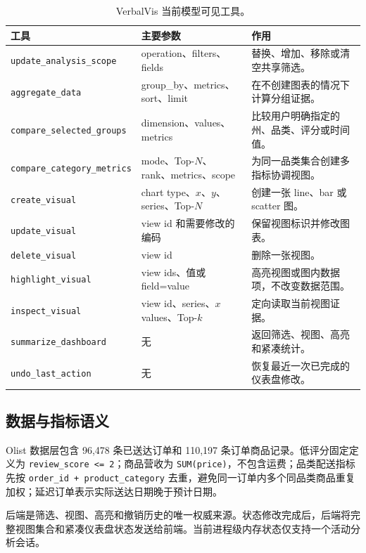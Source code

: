 \documentclass[UTF8,a4paper,10.5pt]{ctexart}
\begin{document}
\begin{table}[t]
\centering
\caption{VerbalVis 当前模型可见工具。}
\label{tab:tools-zh}
\small
\begin{tabularx}{\textwidth}{p{}p{}X}
\toprule
\textbf{工具} & \textbf{主要参数} & \textbf{作用} \\
\midrule
\texttt{update\_analysis\_scope} & operation、filters、fields & 替换、增加、移除或清空共享筛选。 \\
\texttt{aggregate\_data} & group\_by、metrics、sort、limit & 在不创建图表的情况下计算分组证据。 \\
\texttt{compare\_selected\_groups} & dimension、values、metrics & 比较用户明确指定的州、品类、评分或时间值。 \\
\texttt{compare\_category\_metrics} & mode、Top-$N$、rank、metrics、scope & 为同一品类集合创建多指标协调视图。 \\
\texttt{create\_visual} & chart type、$x$、$y$、series、Top-$N$ & 创建一张 line、bar 或 scatter 图。 \\
\texttt{update\_visual} & view id 和需要修改的编码 & 保留视图标识并修改图表。 \\
\texttt{delete\_visual} & view id & 删除一张视图。 \\
\texttt{highlight\_visual} & view ids、值或 field=value & 高亮视图或图内数据项，不改变数据范围。 \\
\texttt{inspect\_visual} & view id、series、$x$ values、Top-$k$ & 定向读取当前视图证据。 \\
\texttt{summarize\_dashboard} & 无 & 返回筛选、视图、高亮和紧凑统计。 \\
\texttt{undo\_last\_action} & 无 & 恢复最近一次已完成的仪表盘修改。 \\
\bottomrule
\end{tabularx}
\end{table}

\subsection{数据与指标语义}

Olist 数据层包含 96,478 条已送达订单和 110,197 条订单商品记录。低评分固定定义为 \texttt{review\_score <= 2}；商品营收为 \texttt{SUM(price)}，不包含运费；品类配送指标先按 \texttt{order\_id + product\_category} 去重，避免同一订单内多个同品类商品重复加权；延迟订单表示实际送达日期晚于预计日期。

后端是筛选、视图、高亮和撤销历史的唯一权威来源。状态修改完成后，后端将完整视图集合和紧凑仪表盘状态发送给前端。当前进程级内存状态仅支持一个活动分析会话。
\end{document}
